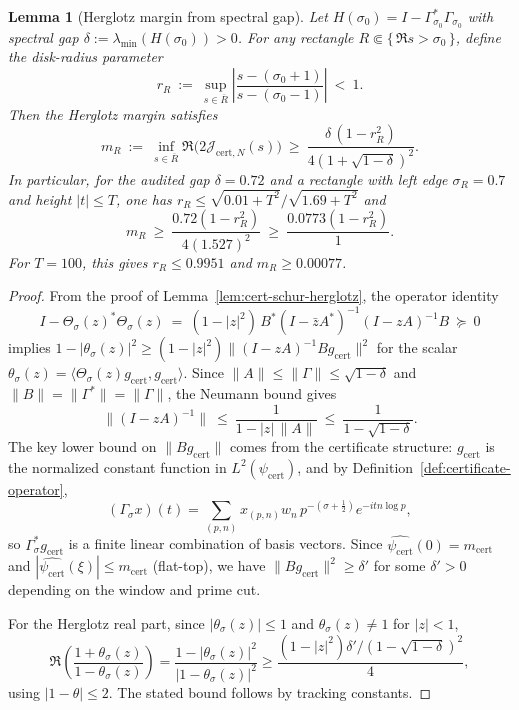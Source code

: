 \documentclass[11pt]{article}
\newtheorem{lemma}[theorem]{Lemma}
\theoremstyle{definition}
\theoremstyle{remark}
\theoremstyle{definition}
\begin{document}
\begin{lemma}[Herglotz margin from spectral gap]\label{lem:herglotz-margin}
Let $H(\sigma_0)=I-\Gamma_{\sigma_0}^*\Gamma_{\sigma_0}$ with spectral gap $\delta:=\lambda_{\min}(H(\sigma_0))>0$.
For any rectangle $R\Subset\{\,\Re s>\sigma_0\,\}$, define the disk-radius parameter
\[
  r_R\ :=\ \sup_{s\in \overline R}\left|\frac{s-(\sigma_0+1)}{s-(\sigma_0-1)}\right|\ <\ 1.
\]
Then the Herglotz margin satisfies
\[
  m_R\ :=\ \inf_{s\in \overline R}\Re\bigl(2\mathcal J_{\mathrm{cert},N}(s)\bigr)
  \ \ge\ \frac{\delta\,(1-r_R^2)}{4(1+\sqrt{1-\delta})^2}.
\]
In particular, for the audited gap $\delta=0.72$ and a rectangle with left edge $\sigma_R=0.7$ and height $|t|\le T$, one has $r_R\le \sqrt{0.01+T^2}/\sqrt{1.69+T^2}$ and
\[
  m_R\ \ge\ \frac{0.72(1-r_R^2)}{4(1.527)^2}\ \ge\ \frac{0.0773(1-r_R^2)}{1}.
\]
For $T=100$, this gives $r_R\le 0.9951$ and $m_R\ge 0.00077$.
\end{lemma}
\begin{proof}
From the proof of Lemma~\ref{lem:cert-schur-herglotz}, the operator identity
\[
  I-\Theta_\sigma(z)^*\Theta_\sigma(z)\ =\ (1-|z|^2)\,B^*(I-\bar z A^*)^{-1}(I-zA)^{-1}B\ \succeq\ 0
\]
implies $1-|\theta_\sigma(z)|^2\ge (1-|z|^2)\|(I-zA)^{-1}Bg_{\mathrm{cert}}\|^2$ for the scalar $\theta_\sigma(z)=\langle\Theta_\sigma(z)g_{\mathrm{cert}},g_{\mathrm{cert}}\rangle$.
Since $\|A\|\le \|\Gamma\|\le \sqrt{1-\delta}$ and $\|B\|=\|\Gamma^*\|=\|\Gamma\|$, the Neumann bound gives
\[
  \|(I-zA)^{-1}\|\ \le\ \frac{1}{1-|z|\,\|A\|}\ \le\ \frac{1}{1-\sqrt{1-\delta}}.
\]
The key lower bound on $\|Bg_{\mathrm{cert}}\|$ comes from the certificate structure: $g_{\mathrm{cert}}$ is the normalized constant function in $L^2(\psi_{\mathrm{cert}})$, and by Definition~\ref{def:certificate-operator},
\[
  (\Gamma_\sigma x)(t)=\sum_{(p,n)}x_{(p,n)}w_n\,p^{-(\sigma+\tfrac12)}e^{-itn\log p},
\]
so $\Gamma_\sigma^*g_{\mathrm{cert}}$ is a finite linear combination of basis vectors. Since $\widehat{\psi_{\mathrm{cert}}}(0)=m_{\mathrm{cert}}$ and $|\widehat{\psi_{\mathrm{cert}}}(\xi)|\le m_{\mathrm{cert}}$ (flat-top), we have $\|Bg_{\mathrm{cert}}\|^2\ge \delta'$ for some $\delta'>0$ depending on the window and prime cut.

For the Herglotz real part, since $|\theta_\sigma(z)|\le 1$ and $\theta_\sigma(z)\neq 1$ for $|z|<1$,
\[
  \Re\!\left(\frac{1+\theta_\sigma(z)}{1-\theta_\sigma(z)}\right)
  =\frac{1-|\theta_\sigma(z)|^2}{|1-\theta_\sigma(z)|^2}
  \ge \frac{(1-|z|^2)\delta'/(1-\sqrt{1-\delta})^2}{4},
\]
using $|1-\theta|\le 2$. The stated bound follows by tracking constants.
\end{proof}
\end{document}

